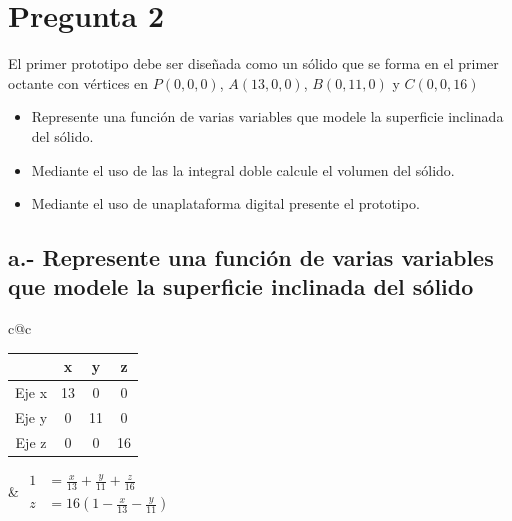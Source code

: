 \section*{Pregunta 2}
\noindent El primer prototipo debe ser diseñada como un sólido que se
forma en el primer octante con vértices en \(P(0,0,0)\),
\(A(13,0,0)\), \(B(0,11,0)\) y \(C(0,0,16)\)

\begin{itemize}
  \item[a.] Represente una función de varias variables que modele la
    superficie inclinada del sólido.
  \item[c.] Mediante el uso de las la integral doble calcule el
    volumen del sólido.
  \item[e.] Mediante el uso de unaplataforma digital presente el prototipo.
\end{itemize}
\vspace{-0.5cm}

\subsection*{a.- Represente una función de varias variables que
modele la superficie inclinada del sólido}
\begin{center}
  \begin{tabular}{c@{\hspace{2cm}}c}
    \begin{tabular}{|c|c|c|c|}
      \hline
      & x & y & z \\
      \hline
      Eje x & 13 & 0 & 0 \\
      \hline
      Eje y & 0 & 11 & 0 \\
      \hline
      Eje z & 0 & 0 & 16 \\
      \hline
    \end{tabular}
    &
    \(
      \begin{aligned}
        1 & = \frac{x}{13} + \frac{y}{11} + \frac{z}{16} \\
        z & = 16 \left(1 - \frac{x}{13} - \frac{y}{11}\right)
      \end{aligned}
    \)
  \end{tabular}
\end{center}

